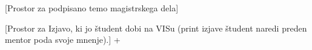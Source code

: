%

\newpage

\mbox{}\thispagestyle{empty}
\newpage
\mbox{}\thispagestyle{empty}
\newpage
\mbox{}\thispagestyle{empty}
\newpage


\newpage
\mbox{}\thispagestyle{empty}
\newpage

\thispagestyle{empty}
[Prostor za podpisano temo magistrskega dela]
\newpage
\mbox{}\thispagestyle{empty}
\newpage

\pagestyle{fancy_nohead}

\newpage
\mbox{}
\newpage

\thispagestyle{empty}
[Prostor za Izjavo, ki jo študent dobi na VISu (print izjave študent naredi preden mentor poda svoje mnenje).]
\newpage+
\mbox{}
\newpage


\newpage

 